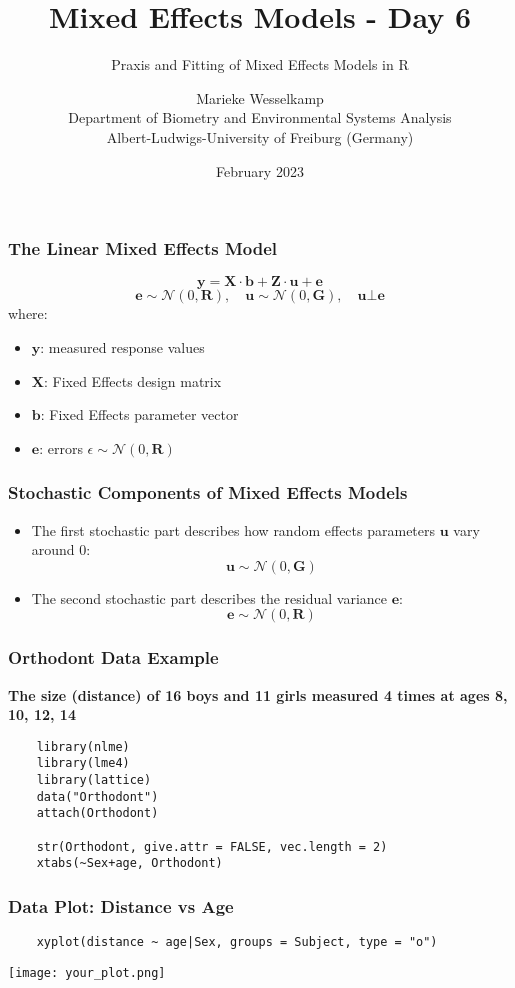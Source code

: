 \documentclass{beamer}
\title{Mixed Effects Models - Day 6}
\subtitle{Praxis and Fitting of Mixed Effects Models in R}
\author{Marieke Wesselkamp\\Department of Biometry and Environmental Systems Analysis\\Albert-Ludwigs-University of Freiburg (Germany)}
\date{February 2023}
\begin{document}
\frame{\titlepage}

\begin{frame}
    \frametitle{The Linear Mixed Effects Model}
    \[
    \mathbf{y} = \mathbf{X} \cdot \mathbf{b} + \mathbf{Z} \cdot \mathbf{u} + \mathbf{e}
    \]
    \[
    \mathbf{e} \sim \mathcal{N}(0, \mathbf{R}), \quad \mathbf{u} \sim \mathcal{N}(0, \mathbf{G}), \quad \mathbf{u} \bot \mathbf{e}
    \]
    where:
    \begin{itemize}
        \item $\mathbf{y}$: measured response values
        \item $\mathbf{X}$: Fixed Effects design matrix
        \item $\mathbf{b}$: Fixed Effects parameter vector
        \item $\mathbf{e}$: errors $\epsilon \sim \mathcal{N}(0, \mathbf{R})$
    \end{itemize}
\end{frame}

\begin{frame}
    \frametitle{Stochastic Components of Mixed Effects Models}
    \begin{itemize}
        \item The first stochastic part describes how random effects parameters $\mathbf{u}$ vary around 0: 
        \[
        \mathbf{u} \sim \mathcal{N}(0, \mathbf{G})
        \]
        \item The second stochastic part describes the residual variance $\mathbf{e}$:
        \[
        \mathbf{e} \sim \mathcal{N}(0, \mathbf{R})
        \]
    \end{itemize}
\end{frame}

\begin{frame}[fragile]
    \frametitle{Orthodont Data Example}
    \textbf{The size (distance) of 16 boys and 11 girls measured 4 times at ages 8, 10, 12, 14}
    \lstset{style=Rstyle}
    \begin{lstlisting}
    library(nlme)
    library(lme4)
    library(lattice)
    data("Orthodont")
    attach(Orthodont)

    str(Orthodont, give.attr = FALSE, vec.length = 2)
    xtabs(~Sex+age, Orthodont)
    \end{lstlisting}
\end{frame}

\begin{frame}[fragile]
    \frametitle{Data Plot: Distance vs Age}
    \lstset{style=Rstyle}
    \begin{lstlisting}
    xyplot(distance ~ age|Sex, groups = Subject, type = "o")
    \end{lstlisting}
    \texttt{[image: your\_plot.png]}
\end{frame}
\end{document}
